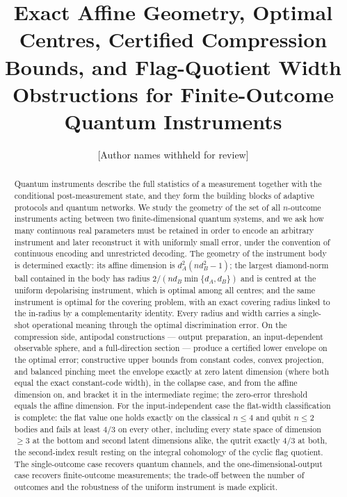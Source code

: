 \documentclass[11pt,a4paper]{article}
\title{\bf Exact Affine Geometry, Optimal Centres, Certified Compression Bounds, and Flag-Quotient Width Obstructions for Finite-Outcome Quantum Instruments}
\author{[Author names withheld for review]}
\date{}
\begin{document}
\maketitle

\begin{abstract}
Quantum instruments describe the full statistics of a measurement together with the conditional post-measurement state, and they form the building blocks of adaptive protocols and quantum networks. We study the geometry of the set of all $n$-outcome instruments acting between two finite-dimensional quantum systems, and we ask how many continuous real parameters must be retained in order to encode an arbitrary instrument and later reconstruct it with uniformly small error, under the convention of continuous encoding and unrestricted decoding. The geometry of the instrument body is determined exactly: its affine dimension is $d_A^2(nd_B^2-1)$; the largest diamond-norm ball contained in the body has radius $2/(nd_B\min\{d_A,d_B\})$ and is centred at the uniform depolarising instrument, which is optimal among all centres; and the same instrument is optimal for the covering problem, with an exact covering radius linked to the in-radius by a complementarity identity. Every radius and width carries a single-shot operational meaning through the optimal discrimination error. On the compression side, antipodal constructions --- output preparation, an input-dependent observable sphere, and a full-direction section --- produce a certified lower envelope on the optimal error; constructive upper bounds from constant codes, convex projection, and balanced pinching meet the envelope exactly at zero latent dimension (where both equal the exact constant-code width), in the collapse case, and from the affine dimension on, and bracket it in the intermediate regime; the zero-error threshold equals the affine dimension. For the input-independent case the flat-width classification is complete: the flat value one holds exactly on the classical $n\le4$ and qubit $n\le2$ bodies and fails at least $4/3$ on every other, including every state space of dimension $\ge3$ at the bottom and second latent dimensions alike, the qutrit exactly $4/3$ at both, the second-index result resting on the integral cohomology of the cyclic flag quotient. The single-outcome case recovers quantum channels, and the one-dimensional-output case recovers finite-outcome measurements; the trade-off between the number of outcomes and the robustness of the uniform instrument is made explicit.
\end{abstract}
\end{document}

